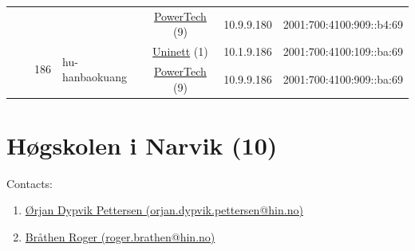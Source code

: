 \begin{small}
\begin{center}
\begin{longtable}{|c|c|c|c|c|c|c|c|}
  &  &  &  & \multicolumn{2}{|c|}{\tiny{\href{http://www.powertech.no}{PowerTech} (9)}} & \tiny{10.9.9.180} & \tiny{2001:700:4100:909::b4:69} \\* \cline{3-3}\cline{4-4}\cline{5-5}\cline{6-6}\cline{7-7}\cline{8-8}
  &  & \multirow{2}{*}{\tiny{186}} & \multicolumn{1}{|l|}{\multirow{2}{*}{\tiny{hu-hanbaokuang}}} & \multicolumn{2}{|c|}{\tiny{\href{https://www.uninett.no}{Uninett} (1)}} & \tiny{10.1.9.186} & \tiny{2001:700:4100:109::ba:69} \\* \cline{5-5}\cline{6-6}\cline{7-7}\cline{8-8}
  &  &  &  & \multicolumn{2}{|c|}{\tiny{\href{http://www.powertech.no}{PowerTech} (9)}} & \tiny{10.9.9.186} & \tiny{2001:700:4100:909::ba:69} \\ \hline
\end{longtable}
\end{center}
\end{small}



\section{Høgskolen i Narvik (10)}
\label{sec:HiN}

Contacts:\begin{enumerate}
 \item {}\href{mailto:orjan.dypvik.pettersen@hin.no}{Ørjan Dypvik Pettersen (orjan.dypvik.pettersen@hin.no)}
 \item {}\href{mailto:roger.brathen@hin.no}{Bråthen Roger (roger.brathen@hin.no)}
\end{enumerate}

